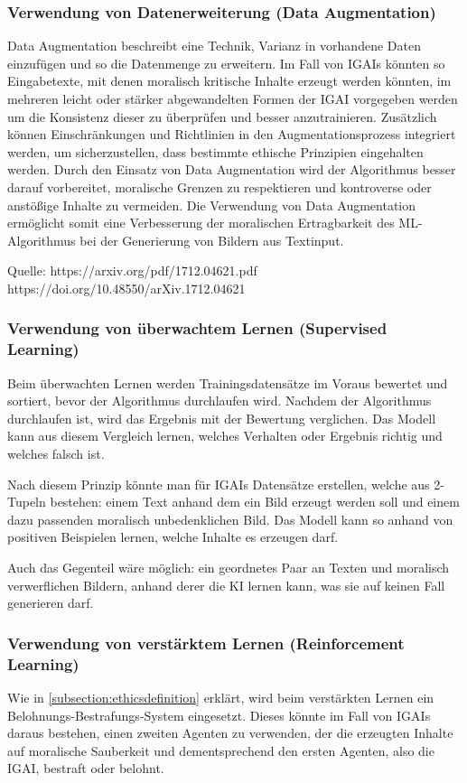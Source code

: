 \documentclass[12pt]{article}
\begin{document}
\subsubsection{Verwendung von Datenerweiterung (Data Augmentation)}
Data Augmentation beschreibt eine Technik, Varianz in vorhandene Daten einzufügen und so die Datenmenge zu erweitern.
Im Fall von IGAIs könnten so Eingabetexte, mit denen moralisch kritische Inhalte erzeugt werden könnten, im mehreren leicht oder stärker abgewandelten Formen der IGAI vorgegeben werden um die Konsistenz dieser zu überprüfen und besser anzutrainieren.  
Zusätzlich können Einschränkungen und Richtlinien in den Augmentationsprozess integriert werden, um sicherzustellen, dass bestimmte ethische Prinzipien eingehalten werden. 
Durch den Einsatz von Data Augmentation wird der Algorithmus besser darauf vorbereitet, moralische Grenzen zu respektieren und kontroverse oder anstößige Inhalte zu vermeiden. 
Die Verwendung von Data Augmentation ermöglicht somit eine Verbesserung der moralischen Ertragbarkeit des ML-Algorithmus bei der Generierung von Bildern aus Textinput.

Quelle: 
https://arxiv.org/pdf/1712.04621.pdf 
https://doi.org/10.48550/arXiv.1712.04621

\subsubsection{Verwendung von überwachtem Lernen (Supervised Learning)}
Beim überwachten Lernen werden Trainingsdatensätze im Voraus bewertet und sortiert, bevor der Algorithmus durchlaufen wird. Nachdem der Algorithmus durchlaufen ist, wird das Ergebnis mit der Bewertung verglichen. 
Das Modell kann aus diesem Vergleich lernen, welches Verhalten oder Ergebnis richtig und welches falsch ist.

Nach diesem Prinzip könnte man für IGAIs Datensätze erstellen, welche aus 2-Tupeln bestehen: einem Text anhand dem ein Bild erzeugt werden soll und einem dazu passenden moralisch unbedenklichen Bild. 
Das Modell kann so anhand von positiven Beispielen lernen, welche Inhalte es erzeugen darf.

Auch das Gegenteil wäre möglich: ein geordnetes Paar an Texten und moralisch verwerflichen Bildern, anhand derer die KI lernen kann, was sie auf keinen Fall generieren darf.

\subsubsection{Verwendung von verstärktem Lernen (Reinforcement Learning)}
Wie in \ref{subsection:ethicsdefinition} erklärt, wird beim verstärkten Lernen ein Belohnungs-Bestrafungs-System eingesetzt. Dieses könnte im Fall von IGAIs daraus bestehen, einen zweiten Agenten zu verwenden, der die erzeugten Inhalte auf moralische Sauberkeit und dementsprechend den ersten Agenten, also die IGAI, bestraft oder belohnt.
\end{document}
